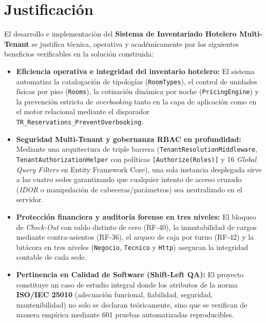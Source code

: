 \documentclass[12pt,a4paper]{article}
\begin{document}
\section{Justificaci\'on}

El desarrollo e implementaci\'on del \textbf{Sistema de Inventariado Hotelero Multi-Tenant} se justifica t\'ecnica, operativa y acad\'emicamente por los siguientes beneficios verificables en la soluci\'on construida:

\begin{itemize}
    \item \textbf{Eficiencia operativa e integridad del inventario hotelero:} El sistema automatiza la catalogaci\'on de tipolog\'ias (\texttt{RoomTypes}), el control de unidades f\'isicas por piso (\texttt{Rooms}), la cotizaci\'on din\'amica por noche (\texttt{PricingEngine}) y la prevenci\'on estricta de \textit{overbooking} tanto en la capa de aplicaci\'on como en el motor relacional mediante el disparador \texttt{TR\_Reservations\_PreventOverbooking}.
    \item \textbf{Seguridad Multi-Tenant y gobernanza RBAC en profundidad:} Mediante una arquitectura de triple barrera (\texttt{TenantResolutionMiddleware}, \texttt{TenantAuthorizationHelper} con pol\'iticas \texttt{[Authorize(Roles)]} y 16 \textit{Global Query Filters} en Entity Framework Core), una sola instancia desplegada sirve a las cuatro sedes garantizando que cualquier intento de acceso cruzado (\textit{IDOR} o manipulaci\'on de cabeceras/par\'ametros) sea neutralizado en el servidor.
    \item \textbf{Protecci\'on financiera y auditor\'ia forense en tres niveles:} El bloqueo de \textit{Check-Out} con saldo distinto de cero (RF-40), la inmutabilidad de cargos mediante contra-asientos (RF-36), el arqueo de caja por turno (RF-42) y la bit\'acora en tres niveles (\texttt{Negocio}, \texttt{Tecnico} y \texttt{Http}) aseguran la integridad contable de cada sede.
    \item \textbf{Pertinencia en Calidad de Software (Shift-Left QA):} El proyecto constituye un caso de estudio integral donde los atributos de la norma \textbf{ISO/IEC 25010} (adecuaci\'on funcional, fiabilidad, seguridad, mantenibilidad) no solo se declaran te\'oricamente, sino que se verifican de manera emp\'irica mediante 601 pruebas automatizadas reproducibles.
\end{itemize}
\end{document}

